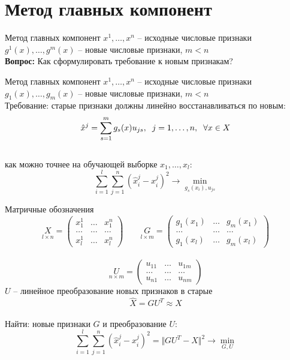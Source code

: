 \documentclass[10pt]{beamer}
\begin{document}
\section{Метод главных компонент}

{
\begin{frame}{Метод главных компонент}
	$x^1, \dots, x^n$ -- исходные числовые признаки\\
	$g^1(x), \dots, g^m(x)$ -- новые числовые признаки, $m < n$\\
	\bigbreak
	\textbf{Вопрос:} Как сформулировать требование к новым признакам?
\end{frame}
}

\begin{frame}{Метод главных компонент}
	$x^1, \dots, x^n$ -- исходные числовые признаки\\
	$g_1(x), \dots, g_m(x)$ -- новые числовые признаки, $m < n$\\
	\bigbreak
	\pause
	Требование: старые признаки должны линейно восстанавливаться по новым:\\
	$$\hat{x}^j = \sum\limits_{s=1}^m g_s(x) u_{js} , \hspace{2mm} j = 1,\dots , n, \hspace{2mm} \forall x \in X$$\\
	как можно точнее на обучающей выборке $x_1, \dots, x_l$:\\
	$$\sum\limits_{i=1}^l \sum\limits_{j=1}^n (\hat{x}_i^j - x_i^j)^2 \rightarrow \min\limits_{g_s(x_i), u_{js}}$$
\end{frame}

\begin{frame}{Матричные обозначения}
	$$\underset{l \times n}{X} = \begin{pmatrix}
	  x_1^1 & \dots & x_1^n \\
	  \dots & \dots & \dots\\
	  x_l^1 & \dots & x_l^n
	 \end{pmatrix} \qquad
	 \underset{l \times m}{G} = \begin{pmatrix}
	  g_1(x_1) & \dots & g_m(x_1) \\
	  \dots & \dots & \dots\\
	  g_1(x_l) & \dots & g_m(x_l)
	 \end{pmatrix}$$\\
	 $$\underset{n \times m}{U} = \begin{pmatrix}
	  u_{11} & \dots & u_{1m} \\
	  \dots & \dots & \dots\\
	  u_{n1} & \dots & u_{nm}
	 \end{pmatrix}$$
	$U$ -- линейное преобразование новых признаков в старые\\
	$$\hat{X} = GU^T \approx X$$\\
	\pause
	\alert{Найти:} новые признаки $G$ и преобразование $U$:\\
	$$\sum\limits_{i=1}^l \sum\limits_{j=1}^n (\hat{x}_i^j - x_i^j)^2 = \Vert GU^T - X \Vert^2 \rightarrow \min\limits_{G, U}$$
\end{frame}
\end{document}
